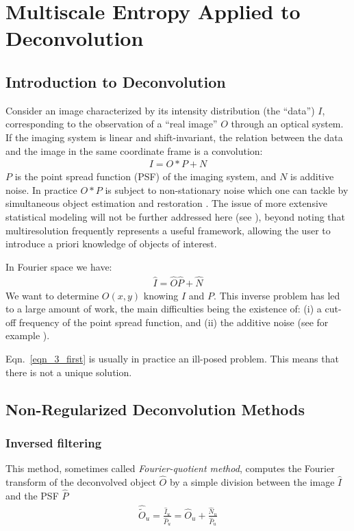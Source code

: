 

\chapter{Multiscale Entropy Applied to Deconvolution}
\label{ch_deconv}
\section{Introduction to Deconvolution}

Consider an image characterized by its intensity
distribution (the ``data'') $I$, corresponding to the observation of a
``real image'' $O$ through an optical system. If the
imaging system is linear and shift-invariant, the relation between
the data and the image in the same coordinate frame is a
convolution:
\begin{eqnarray}
I = O * P + N
\label{eqn_3_first}
\end{eqnarray}
$P$ is the point spread function (PSF) of the imaging system, and $N$
is additive noise. In practice $O * P$ is subject to non-stationary noise
which one can tackle by simultaneous object estimation and restoration
\cite{rest:katsaggelos91}. 
The issue of more extensive statistical
modeling will not be further addressed here (see 
\cite{rest:llacer90,rest:lorenz93,rest:molina93}), 
beyond noting that multiresolution
frequently represents a useful framework, allowing the user to introduce
a priori knowledge of objects of interest.

In Fourier space we have:
\begin{eqnarray}
\hat I= \hat O \hat P + \hat N
\end{eqnarray}
We want to determine $O(x,y)$ knowing $I$ and $P$. This
inverse problem has led to a large amount of work, the main difficulties 
being the existence of: (i) a cut-off frequency of the 
point spread function, 
and (ii) the additive noise (see for example \cite{rest:cornwell88}).
 
Eqn.\ \ref{eqn_3_first} is usually in practice an ill-posed problem.
This means that there is not a unique solution.  

\section{Non-Regularized Deconvolution Methods}
\subsection*{Inversed filtering}
This method, sometimes called   {\em  Fourier-quotient method},
 computes
  the Fourier transform of the deconvolved object $\hat{O}$ by
  a simple division between the image $\hat{I}$ and the PSF $\hat{P}$
\begin{eqnarray}
\hat{\tilde{O}}_u=\frac{\hat{I}_u}{\hat{P}_u}=
   \hat{O}_u+\frac{\hat{N}_u}{\hat{P}_u}
\end{eqnarray}

